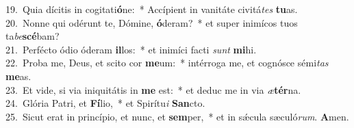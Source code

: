 {19.~}Quia dícitis in cogitati\textbf{ó}ne:~* Accípient in vanitáte civitá\textit{tes} \textbf{tu}as.\\
{20.~}Nonne qui odérunt te, Dómine, \textbf{ó}deram?~* et super inimícos tuos ta\textit{be}\textbf{scé}bam?\\
{21.~}Perfécto ódio óderam \textbf{il}los:~* et inimíci facti \textit{sunt} \textbf{mi}hi.\\
{22.~}Proba me, Deus, et scito cor \textbf{me}um:~* intérroga me, et cognósce sémi\textit{tas} \textbf{me}as.\\
{23.~}Et vide, si via iniquitátis in \textbf{me} est:~* et deduc me in via \textit{æ}\textbf{tér}na.\\
{24.~}Glória Patri, et \textbf{Fí}lio,~* et Spirítu\textit{i} \textbf{San}cto.\\
{25.~}Sicut erat in princípio, et nunc, et \textbf{sem}per,~* et in sǽcula sæculó\textit{rum}. \textbf{A}men.\\

